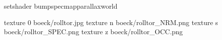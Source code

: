 setshader bumpspecmapparallaxworld

texture 0 boeck/rolltor.jpg
texture n boeck/rolltor_NRM.png
texture s boeck/rolltor_SPEC.png
texture z boeck/rolltor_OCC.png

